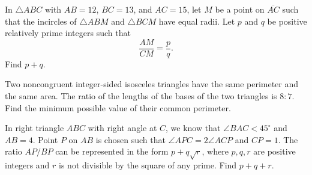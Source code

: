 %	












\begin{question}[name={2010 AIME I, \href{https://artofproblemsolving.com/community/c4p1813787}{Problem 15}}]
	In $ \triangle{ABC}$ with $ AB = 12$, $ BC = 13$, and $ AC = 15$, let $ M$ be a point on $ \overline{AC}$ such that the incircles of $ \triangle{ABM}$ and $ \triangle{BCM}$ have equal radii. Let $ p$ and $ q$ be positive relatively prime integers such that $$ \frac{AM}{CM} = \frac{p}{q}.$$ Find $p + q$.
\end{question}


%	












\begin{question}[name={2010 AIME II, \href{https://artofproblemsolving.com/community/c4p1832362}{Problem 12}}]
	Two noncongruent integer-sided isosceles triangles have the same perimeter and the same area. The ratio of the lengths of the bases of the two triangles is $ 8: 7$. Find the minimum possible value of their common perimeter.
	
\end{question}


%	












\begin{question}[name={2010 AIME II, \href{https://artofproblemsolving.com/community/c4p1831370}{Problem 14}}]
	In right triangle $ ABC$ with right angle at $ C$, we know that $ \angle BAC < 45^{\circ}$ and $ AB = 4$. Point $ P$ on $ AB$ is chosen such that $ \angle APC = 2\angle ACP$ and $ CP = 1$. The ratio ${AP}/{BP}$ can be represented in the form $ p + q\sqrt{r}$, where $ p,q,r$ are positive integers and $ r$ is not divisible by the square of any prime. Find $p+q+r$.
\end{question}


